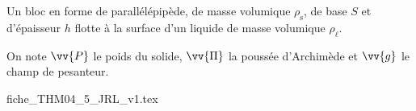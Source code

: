 \hauteurLargeurCadreReponse		{8mm}{3cm}
\initialisationEntrainement

                                \initialisationPartieGauche %
Un bloc en forme de parallélépipède, de masse volumique $\rho_\text{s}$, de base $S$ et d'épaisseur $h$ flotte à la surface d'un liquide de masse volumique $\rho_\ell$. 

\smallskip

On note $\vv{P}$ le poids du solide, $\vv{\Pi}$ la poussée d'Archimède et $\vv{g}$ le champ de pesanteur.

                                \initialisationPartieDroite %
\begin{center}
{fiche_THM04_5_JRL_v1.tex}
\end{center}
                               \finalisationDuPartageDePage %

